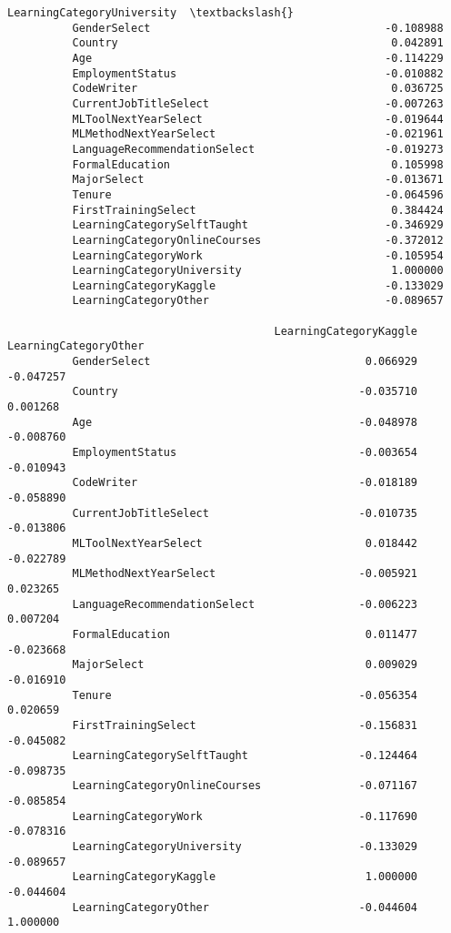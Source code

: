 \documentclass[11pt]{article}
\begin{document}
\begin{Verbatim}[commandchars=\\\{\}]
                                         LearningCategoryUniversity  \textbackslash{}
          GenderSelect                                    -0.108988   
          Country                                          0.042891   
          Age                                             -0.114229   
          EmploymentStatus                                -0.010882   
          CodeWriter                                       0.036725   
          CurrentJobTitleSelect                           -0.007263   
          MLToolNextYearSelect                            -0.019644   
          MLMethodNextYearSelect                          -0.021961   
          LanguageRecommendationSelect                    -0.019273   
          FormalEducation                                  0.105998   
          MajorSelect                                     -0.013671   
          Tenure                                          -0.064596   
          FirstTrainingSelect                              0.384424   
          LearningCategorySelftTaught                     -0.346929   
          LearningCategoryOnlineCourses                   -0.372012   
          LearningCategoryWork                            -0.105954   
          LearningCategoryUniversity                       1.000000   
          LearningCategoryKaggle                          -0.133029   
          LearningCategoryOther                           -0.089657   
          
                                         LearningCategoryKaggle  LearningCategoryOther  
          GenderSelect                                 0.066929              -0.047257  
          Country                                     -0.035710               0.001268  
          Age                                         -0.048978              -0.008760  
          EmploymentStatus                            -0.003654              -0.010943  
          CodeWriter                                  -0.018189              -0.058890  
          CurrentJobTitleSelect                       -0.010735              -0.013806  
          MLToolNextYearSelect                         0.018442              -0.022789  
          MLMethodNextYearSelect                      -0.005921               0.023265  
          LanguageRecommendationSelect                -0.006223               0.007204  
          FormalEducation                              0.011477              -0.023668  
          MajorSelect                                  0.009029              -0.016910  
          Tenure                                      -0.056354               0.020659  
          FirstTrainingSelect                         -0.156831              -0.045082  
          LearningCategorySelftTaught                 -0.124464              -0.098735  
          LearningCategoryOnlineCourses               -0.071167              -0.085854  
          LearningCategoryWork                        -0.117690              -0.078316  
          LearningCategoryUniversity                  -0.133029              -0.089657  
          LearningCategoryKaggle                       1.000000              -0.044604  
          LearningCategoryOther                       -0.044604               1.000000  
\end{Verbatim}
\end{document}
